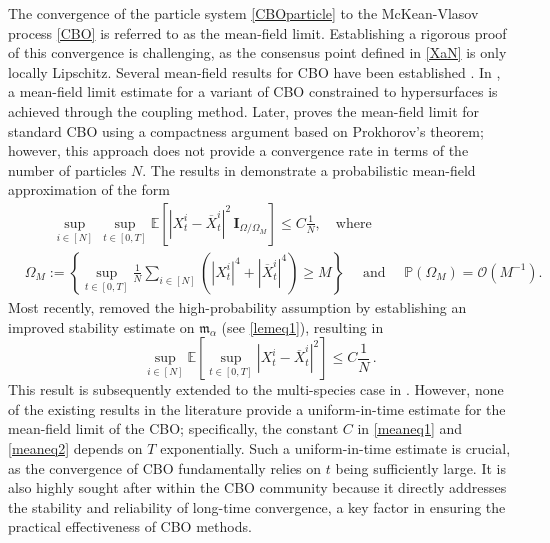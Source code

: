 \documentclass[12pt]{amsart}
\newcommand{\EE}{{\mathbb E}}
\newcommand{\OX}{{\overline{X}}}
\newcommand{\mc}[1]{\mathcal{#1}}
\numberwithin{equation}{section}
\begin{document}
The convergence of the particle system \eqref{CBOparticle} to the McKean-Vlasov process \eqref{CBO} is referred to as the mean-field limit. Establishing a rigorous proof of this convergence is challenging, as the consensus point defined in \eqref{XaN} is only locally Lipschitz. Several mean-field results for CBO have been established \cite{fornasier2020consensus,huang2022mean, fornasier2024consensus, gerber2023mean}. In \cite{fornasier2020consensus}, a mean-field limit estimate for a variant of CBO constrained to hypersurfaces is achieved through the coupling method. Later, \cite{huang2022mean} proves the mean-field limit for standard CBO using a compactness argument based on Prokhorov's theorem; however, this approach does not provide a convergence rate in terms of the number of particles $N$. The results in \cite{fornasier2024consensus}  demonstrate a probabilistic mean-field approximation of the form
\begin{equation}\label{meaneq1}
\begin{aligned}
	& \quad \quad \sup_{i\in[N]} \, \sup_{t\in[0,T]}\EE\left[|X_t^i-\OX_t^i|^2 \,\textbf{I}_{\Omega/\Omega_M}\right]\leq C\frac{1}{N}, \quad \text{where }\\
     &  \Omega_M:=\left\{\sup_{t\in[0,T]}\frac{1}{N}\sum_{i\in[N]}(|X_t^i|^4+|\OX_t^i|^4)\geq M\right\} \quad \text{ and } \quad \mathbb{P}(\Omega_M)=\mc{O}(M^{-1}).
\end{aligned}
\end{equation} 
Most recently, \cite{gerber2023mean} removed the high-probability assumption by establishing an improved stability estimate on $\mathfrak{m}_{\alpha}$ (see \eqref{lemeq1}), resulting in
\begin{equation}\label{meaneq2}
\sup_{i\in[N]}\EE\left[\sup_{t\in[0,T]}|X_t^i-\OX_t^i|^2\right]\leq C\frac{1}{N}\,.
\end{equation}
This result is subsequently extended to the multi-species case in \cite{huang2025well}. However, none of the existing results in the literature provide a uniform-in-time estimate for the mean-field limit of the CBO; specifically, the constant $C$ in \eqref{meaneq1} and \eqref{meaneq2} depends on $T$ exponentially. Such a uniform-in-time estimate is crucial, as the convergence of CBO fundamentally relies on $t$ being sufficiently large. It is also highly sought after within the CBO community because it directly addresses the stability and reliability of long-time convergence, a key factor in ensuring the practical effectiveness of CBO methods. 
\end{document}
